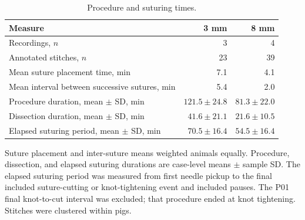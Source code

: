 \begin{table}[htbp]
\centering
\caption{Procedure and suturing times.}
\label{tab:sutures}
\small
\begin{tabularx}{\linewidth}{@{}Xrr@{}}
\toprule
Measure & 3 mm & 8 mm \\
\midrule
Recordings, $n$ & 3 & 4 \\
Annotated stitches, $n$ & 23 & 39 \\
Mean suture placement time, min & 7.1 & 4.1 \\
Mean interval between successive sutures, min & 5.4 & 2.0 \\
Procedure duration, mean $\pm$ SD, min & $121.5 \pm 24.8$ & $81.3 \pm 22.0$ \\
Dissection duration, mean $\pm$ SD, min & $41.6 \pm 21.1$ & $21.6 \pm 10.5$ \\
Elapsed suturing period, mean $\pm$ SD, min & $70.5 \pm 16.4$ & $54.5 \pm 16.4$ \\
\bottomrule
\end{tabularx}
\par\smallskip
\begin{minipage}{\linewidth}\footnotesize
Suture placement and inter-suture means weighted animals equally. Procedure, dissection, and elapsed suturing durations are case-level means $\pm$ sample SD. The elapsed suturing period was measured from first needle pickup to the final included suture-cutting or knot-tightening event and included pauses. The P01 final knot-to-cut interval was excluded; that procedure ended at knot tightening. Stitches were clustered within pigs.
\end{minipage}
\end{table}
